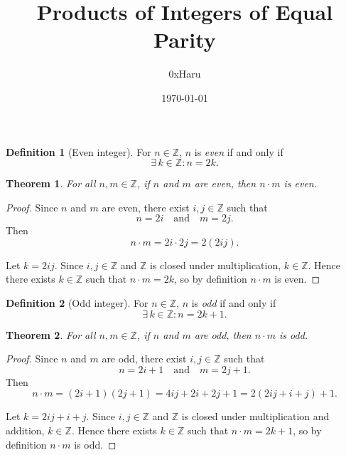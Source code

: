 \documentclass[12pt]{article}
\theoremstyle{definition}
\newtheorem{definition}{Definition}
\theoremstyle{plain}
\newtheorem{theorem}{Theorem}
\begin{document}
\title{\textbf{Products of Integers of Equal Parity}}
\author{0xHaru}
\date{\today}
\maketitle

\begin{definition}[Even integer]
    For $n \in \mathbb{Z}$, $n$ is \emph{even} if and only if
    \[
        \exists\, k \in \mathbb{Z} : n = 2k.
    \]
\end{definition}

\begin{theorem}
    For all $n, m \in \mathbb{Z}$, if $n$ and $m$ are even, then $n \cdot m$ is even.
\end{theorem}

\begin{proof}
    Since $n$ and $m$ are even, there exist $i, j \in \mathbb{Z}$ such that
    \[
        n = 2i \quad \text{and} \quad m = 2j.
    \]
    Then
    \[
        n \cdot m = 2i \cdot 2j = 2(2ij).
    \]

    \medskip

    Let $k = 2ij$. Since $i, j \in \mathbb{Z}$ and $\mathbb{Z}$ is closed under
    multiplication, $k \in \mathbb{Z}$.
    Hence there exists $k \in \mathbb{Z}$ such that $n \cdot m = 2k$, so by
    definition $n \cdot m$ is even.
\end{proof}


\bigskip

\begin{definition}[Odd integer]
    For $n \in \mathbb{Z}$, $n$ is \emph{odd} if and only if
    \[
        \exists\, k \in \mathbb{Z} : n = 2k + 1.
    \]
\end{definition}

\begin{theorem}
    For all $n, m \in \mathbb{Z}$, if $n$ and $m$ are odd, then $n \cdot m$ is odd.
\end{theorem}

\begin{proof}
    Since $n$ and $m$ are odd, there exist $i, j \in \mathbb{Z}$ such that
    \[
        n = 2i + 1 \quad \text{and} \quad m = 2j + 1.
    \]
    Then
    \[
        n \cdot m = (2i + 1)(2j + 1) = 4ij + 2i + 2j + 1 = 2(2ij + i + j) + 1.
    \]

    \medskip

    Let $k = 2ij + i + j$. Since $i, j \in \mathbb{Z}$ and $\mathbb{Z}$ is closed under
    multiplication and addition, $k \in \mathbb{Z}$.
    Hence there exists $k \in \mathbb{Z}$ such that $n \cdot m = 2k + 1$, so by
    definition $n \cdot m$ is odd.
\end{proof}
\end{document}
